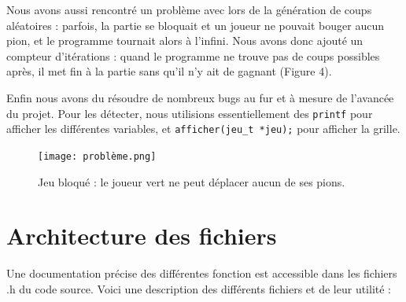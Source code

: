\documentclass{article}
\begin{document}
Nous avons aussi rencontré un problème avec lors de la génération de coups aléatoires : parfois, la partie se bloquait et un joueur ne pouvait bouger aucun pion, et le programme tournait alors à l'infini. Nous avons donc ajouté un compteur d'itérations : quand le programme ne trouve pas de coups possibles après, il met fin à la partie sans qu'il n'y ait de gagnant (Figure 4).

Enfin nous avons du résoudre de nombreux bugs au fur et à mesure de l'avancée du projet. Pour les détecter, nous utilisions essentiellement des {\tt printf} pour afficher les différentes variables, et {\tt afficher(jeu\_t *jeu);} pour afficher la grille.

\begin{figure}[H]
    \centering
    \texttt{[image: problème.png]}
    \caption{Jeu bloqué : le joueur vert ne peut déplacer aucun de ses pions.}
    \label{fig:4}
\end{figure}






\section{Architecture des fichiers}

Une documentation précise des différentes fonction est accessible dans les fichiers .h du code source. Voici une description des différents fichiers et de leur utilité :
\end{document}
